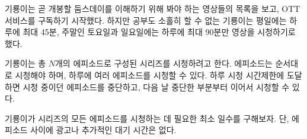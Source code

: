 기룡이는 곧 개봉할 둠스데이를 이해하기 위해 봐야 하는 영상들의 목록을 보고, OTT 서비스를 구독하기 시작했다. 하지만 공부도 소홀히 할 수 없는 기룡이는 평일에는 하루에 최대 45분, 주말인 토요일과 일요일에는 하루에 최대 90분만 영상을 시청하기로 했다.

기룡이는 총 $N$개의 에피소드로 구성된 시리즈를 시청하려고 한다. 에피소드는 순서대로 시청해야 하며, 하루에 여러 에피소드를 시청할 수 있다. 
하루 시청 시간제한에 도달하면 시청 중이던 에피소드를 중단하고, 
다음 날 중단한 부분부터 이어서 시청할 수 있다.

기룡이가 시리즈의 모든 에피소드를 시청하는 데 필요한 최소 일수를 구해보자. 
단, 에피소드 사이에 광고나 추가적인 대기 시간은 없다.
